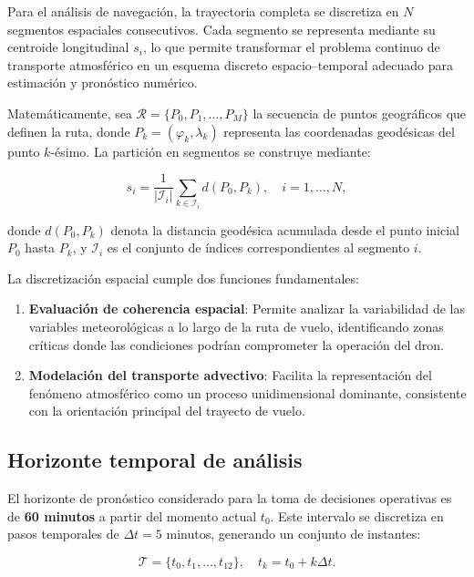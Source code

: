 \documentclass[
  spanish,
  us-letterpaper,
]{scrreprt}
\numberwithin{equation}{section}
\begin{document}
Para el análisis de navegación, la trayectoria completa se discretiza en
\(N\) segmentos espaciales consecutivos. Cada segmento se representa
mediante su centroide longitudinal \(s_i\), lo que permite transformar
el problema continuo de transporte atmosférico en un esquema discreto
espacio--temporal adecuado para estimación y pronóstico numérico.

Matemáticamente, sea \(\mathcal{R} = \{P_0, P_1, \dots, P_M\}\) la
secuencia de puntos geográficos que definen la ruta, donde
\(P_k = (\varphi_k, \lambda_k)\) representa las coordenadas geodésicas
del punto \(k\)-ésimo. La partición en segmentos se construye mediante:

\[
s_i = \frac{1}{|\mathcal{I}_i|} \sum_{k \in \mathcal{I}_i} d(P_0, P_k), \quad i = 1, \dots, N,
\]

donde \(d(P_0, P_k)\) denota la distancia geodésica acumulada desde el
punto inicial \(P_0\) hasta \(P_k\), y \(\mathcal{I}_i\) es el conjunto
de índices correspondientes al segmento \(i\).

La discretización espacial cumple dos funciones fundamentales:

\begin{enumerate}
\def\labelenumi{\arabic{enumi}.}
\item
  \textbf{Evaluación de coherencia espacial}: Permite analizar la
  variabilidad de las variables meteorológicas a lo largo de la ruta de
  vuelo, identificando zonas críticas donde las condiciones podrían
  comprometer la operación del dron.
\item
  \textbf{Modelación del transporte advectivo}: Facilita la
  representación del fenómeno atmosférico como un proceso unidimensional
  dominante, consistente con la orientación principal del trayecto de
  vuelo.
\end{enumerate}

\subsection{Horizonte temporal de
análisis}\label{horizonte-temporal-de-anuxe1lisis}

El horizonte de pronóstico considerado para la toma de decisiones
operativas es de \textbf{60 minutos} a partir del momento actual
\(t_0\). Este intervalo se discretiza en pasos temporales de
\(\Delta t = 5\) minutos, generando un conjunto de instantes:

\[
\mathcal{T} = \{t_0, t_1, \dots, t_{12}\}, \quad t_k = t_0 + k\Delta t.
\]
\end{document}
